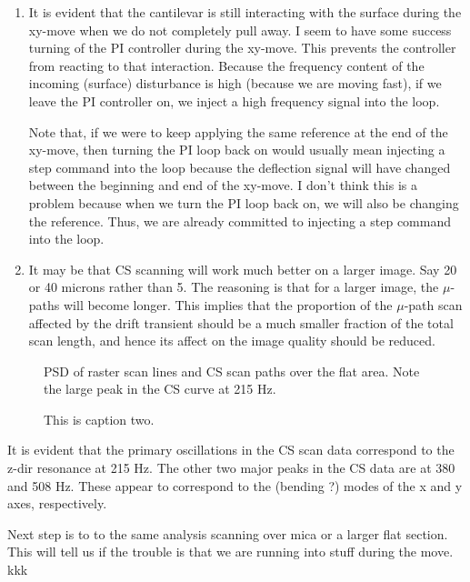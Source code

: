 \documentclass[11pt]{article}
\begin{document}
\begin{enumerate}
\item It is evident that the cantilevar is still interacting with the surface during the xy-move when we do not completely pull away. I seem to have some success turning of the PI controller during the xy-move. This prevents the controller from reacting to that interaction. Because the frequency content of the incoming (surface) disturbance is high (because we are moving fast), if we leave the PI controller on, we inject a high frequency signal into the loop. 

Note that, if we were to keep applying the same reference at the end of the xy-move, then turning the PI loop back on would usually mean injecting a step command into the loop because the deflection signal will have changed between the beginning and end of the xy-move. I don't think this is a problem because when we turn the PI loop back on, we will also be changing the reference. Thus, we are already committed to injecting a step command into the loop.

\item It may be that CS scanning will work much better on a larger image. Say 20 or 40 microns rather than 5. The reasoning is that for a larger image, the \(\mu\)-paths will become longer. This implies that the proportion of the \(\mu\)-path scan affected by the drift transient should be a much smaller fraction of the total scan length, and hence its affect on the image quality should be reduced.
\end{enumerate}

\begin{figure}[htbp]
\centering

\caption{\label{fig:with_iso}
PSD of raster scan lines and CS scan paths over the flat area. Note the large peak in the CS curve at 215 Hz.}
\end{figure}
\begin{figure}[htbp]
\centering

\caption{This is caption two.}
\end{figure}
It is evident that the primary oscillations in the CS scan data correspond to the z-dir resonance at 215 Hz. The other two major peaks in the CS data are at 380 and 508 Hz. These appear to correspond to the (bending ?) modes of the x and y axes, respectively. 


Next step is to to the same analysis scanning over mica or a larger flat section. This will tell us if the trouble is that we are running into stuff during the move.
kkk
\end{document}

